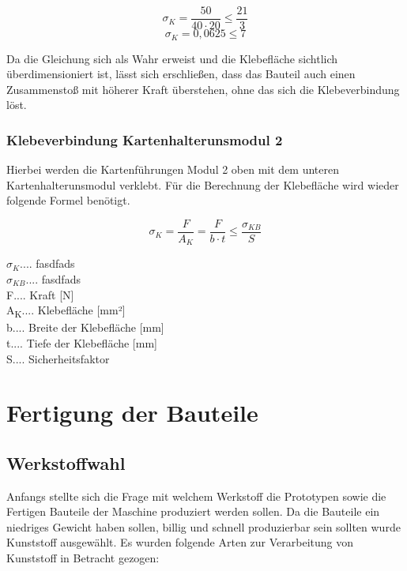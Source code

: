 \[\sigma _{K} = \frac{50}{40\cdot 20}\leq \frac{21}{3}\]
\[\sigma _{K} = 0,0625\leq 7\]

Da die Gleichung sich als Wahr erweist und die Klebefläche sichtlich überdimensioniert ist, lässt sich erschließen,
dass das Bauteil auch einen Zusammenstoß mit höherer Kraft überstehen, ohne das sich die Klebeverbindung löst.

\subsubsection{Klebeverbindung Kartenhalterunsmodul 2}
Hierbei werden die Kartenführungen Modul 2 oben mit dem unteren Kartenhalterunsmodul verklebt.
Für die Berechnung der Klebefläche wird wieder folgende Formel benötigt.

\[\sigma _{K} = \frac{F}{A_{K}} = \frac{F}{b\cdot t}\leq \frac{\sigma _{KB}}{S}\]

$\sigma_{K}$.... fasdfads \\
$\sigma_{KB}$.... fasdfads\\
F.... Kraft [N]\\
A\textsubscript{K}.... Klebefläche [mm²]\\
b.... Breite der Klebefläche [mm]\\
t.... Tiefe der Klebefläche [mm]\\
S.... Sicherheitsfaktor\\

\section{Fertigung der Bauteile}
\subsection{Werkstoffwahl}
Anfangs stellte sich die Frage mit welchem Werkstoff die Prototypen sowie die Fertigen Bauteile der
Maschine produziert werden sollen. Da die Bauteile ein niedriges Gewicht haben sollen, billig und schnell produzierbar
sein sollten wurde Kunststoff ausgewählt. Es wurden folgende Arten zur Verarbeitung von Kunststoff in Betracht gezogen:
